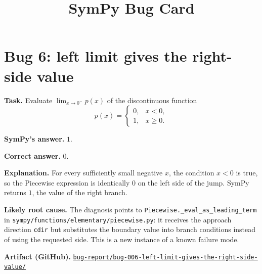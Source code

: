 \documentclass[11pt]{article}
\title{SymPy Bug Card}
\author{}
\date{}
\newcommand{\artifactrepo}{https://github.com/TODO-org/TODO-repo}
\newcommand{\bugbundle}[1]{\href{\artifactrepo/tree/main/bug-report/#1}{\nolinkurl{bug-report/#1/}}}
\begin{document}
\maketitle

\section*{Bug 6: left limit gives the right-side value}

\begin{counterexamplebox}
\textbf{Task.} Evaluate \(\lim_{x\to 0^-}p(x)\) of the discontinuous function
\[
  p(x)=
  \begin{cases}
    0, & x<0,\\
    1, & x\geq 0.
  \end{cases}
\]


\medskip
\textbf{SymPy's answer.} \(1\).

\medskip
\textbf{Correct answer.} \(0\).

\medskip
\textbf{Explanation.} For every sufficiently small negative \(x\), the condition
\(x<0\) is true, so the Piecewise expression is identically \(0\) on the left
side of the jump.  SymPy returns \(1\), the value of the right branch.

\medskip
\textbf{Likely root cause.} The diagnosis points to
\texttt{Piecewise.\_eval\_as\_leading\_term} in
\nolinkurl{sympy/functions/elementary/piecewise.py}: it receives the approach
direction \texttt{cdir} but substitutes the boundary value into branch
conditions instead of using the requested side.  This is a new instance of a known failure mode.

\medskip
\textbf{Artifact (GitHub).} \bugbundle{bug-006-left-limit-gives-the-right-side-value}
\end{counterexamplebox}
\end{document}
